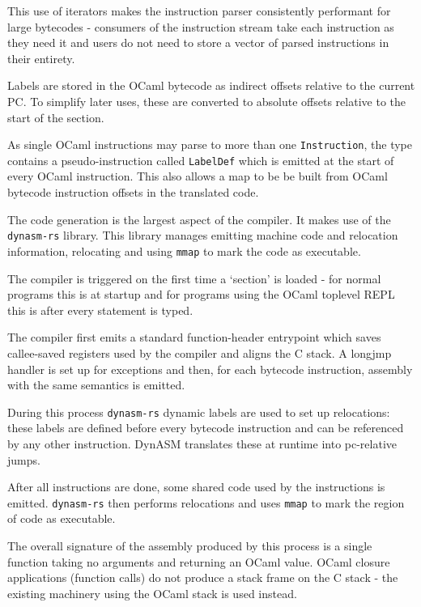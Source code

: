 This use of iterators makes the instruction parser consistently performant for large bytecodes -
consumers of the instruction stream take each instruction as they need it and users do not need to
store a vector of parsed instructions in their entirety.

Labels are stored in the OCaml bytecode as indirect offsets relative to the current PC. To simplify
later uses, these are converted to absolute offsets relative to the start of the section.

As single OCaml instructions may parse to more than one \texttt{Instruction}, the type
contains a pseudo-instruction called \texttt{LabelDef} which is emitted at
the start of every OCaml instruction. This also allows a map to be be built from OCaml bytecode
instruction offsets in the translated code.


The code generation is the largest aspect of the compiler. It makes use of the \texttt{dynasm-rs}
library. This library manages emitting machine code and relocation information, relocating and
using \texttt{mmap} to mark the code as executable.

The compiler is triggered on the first time a `section' is loaded - for normal programs this is at
startup and for programs using the OCaml toplevel REPL this is after every statement is typed.

The compiler first emits a standard function-header entrypoint which saves callee-saved registers
used by the compiler and aligns the C stack. A longjmp handler is set up for exceptions and then,
for each bytecode instruction, assembly with the same semantics is emitted.

During this process \texttt{dynasm-rs} dynamic labels are used to set up relocations: these
labels are defined before every bytecode instruction and can be referenced by any other
instruction. DynASM translates these at runtime into pc-relative jumps.

After all instructions are done, some shared code used by the instructions is emitted.
\texttt{dynasm-rs} then performs relocations and uses \texttt{mmap} to mark the region of code as
executable.

The overall signature of the assembly produced by this process is a single function taking no
arguments and returning an OCaml value. OCaml closure applications (function calls) do not produce
a stack frame on the C stack - the existing machinery using the OCaml stack is used instead.


